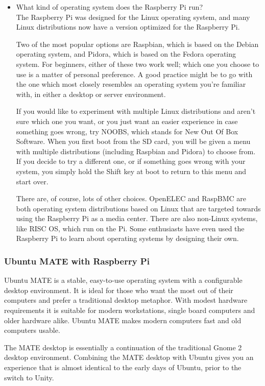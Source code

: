 \begin{itemize}
	\item What kind of operating system does the Raspberry Pi run?\\
	
	The Raspberry Pi was designed for the Linux operating system, and many Linux distributions now have a version optimized for the Raspberry Pi.
	
	Two of the most popular options are Raspbian, which is based on the Debian operating system, and Pidora, which is based on the Fedora operating system. For beginners, either of these two work well; which one you choose to use is a matter of personal preference. A good practice might be to go with the one which most closely resembles an operating system you’re familiar with, in either a desktop or server environment.
	
	If you would like to experiment with multiple Linux distributions and aren't sure which one you want, or you just want an easier experience in case something goes wrong, try NOOBS, which stands for New Out Of Box Software. When you first boot from the SD card, you will be given a menu with multiple distributions (including Raspbian and Pidora) to choose from. If you decide to try a different one, or if something goes wrong with your system, you simply hold the Shift key at boot to return to this menu and start over.
	
	There are, of course, lots of other choices. OpenELEC and RaspBMC are both operating system distributions based on Linux that are targeted towards using the Raspberry Pi as a media center. There are also non-Linux systems, like RISC OS, which run on the Pi. Some enthusiasts have even used the Raspberry Pi to learn about operating systems by designing their own.
\end{itemize}

	\subsubsection{Ubuntu MATE with Raspberry Pi}
	Ubuntu MATE is a stable, easy-to-use operating system with a configurable desktop environment. It is ideal for those who want the most out of their computers and prefer a traditional desktop metaphor. With modest hardware requirements it is suitable for modern workstations, single board computers and older hardware alike. Ubuntu MATE makes modern computers fast and old computers usable.
	
	The MATE desktop is essentially a continuation of the traditional Gnome 2 desktop environment. Combining the MATE desktop with Ubuntu gives you an experience that is almost identical to the early days of Ubuntu, prior to the switch to Unity.
	
